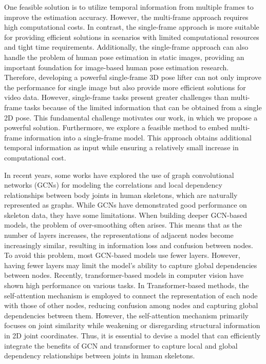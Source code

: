 \documentclass[journal]{IEEEtran}
\begin{document}
One feasible solution is to utilize temporal information from multiple frames to improve the estimation accuracy. However, the multi-frame approach \cite{pavllo20193d,zheng20213d,zhao2023poseformerv2} requires high computational costs. In contrast, the single-frame approach is more suitable for providing efficient solutions in scenarios with limited computational resources and tight time requirements. Additionally, the single-frame approach can also handle the problem of human pose estimation in static images, providing an important foundation for image-based human pose estimation research. Therefore, developing a powerful single-frame 3D pose lifter can not only improve the performance for single image but also provide more efficient solutions for video data. However, single-frame tasks present greater challenges than multi-frame tasks because of the limited information that can be obtained from a single 2D pose. This fundamental challenge motivates our work, in which we propose a powerful solution. Furthermore, we explore a feasible method to embed multi-frame information into a single-frame model. This approach obtains additional temporal information as input while ensuring a relatively small increase in computational cost.


In recent years, some works \cite{cai2019exploiting,xu2021graph,liu2020comprehensive,zhao2019semantic,zou2021modulated} have explored the use of graph convolutional networks (GCNs) for modeling the correlations and local dependency relationships between body joints in human skeletons, which are naturally represented as graphs. While GCNs have demonstrated good performance on skeleton data, they have some limitations. When building deeper GCN-based models, the problem of over-smoothing often arises. This means that as the number of layers increases, the representations of adjacent nodes become increasingly similar, resulting in information loss and confusion between nodes. To avoid this problem, most GCN-based models use fewer layers. However, having fewer layers may limit the model's ability to capture global dependencies between nodes. Recently, transformer-based models \cite{vaswani2017attention,carion2020end,bao2021beit} in computer vision have shown high performance on various tasks. In Transformer-based methods\cite{zheng20213d,lutz2022jointformer,zhao2022graformer}, the self-attention mechanism is employed to connect the representation of each node with those of other nodes, reducing confusion among nodes and capturing global dependencies between them. However, the self-attention mechanism primarily focuses on joint similarity while weakening or disregarding structural information in 2D joint coordinates. Thus, it is essential to devise a model that can efficiently integrate the benefits of GCN and transformer to capture local and global dependency relationships between joints in human skeletons.
\end{document}

